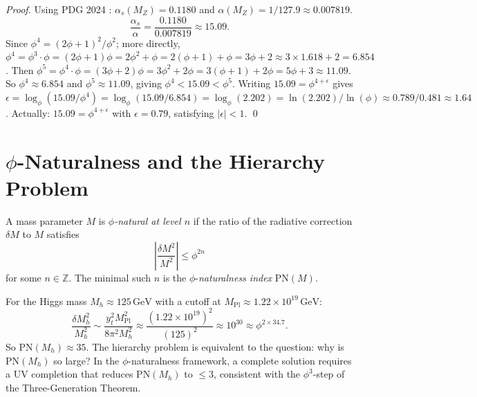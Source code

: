 \begin{proof}
Using PDG 2024 \cite{pdg2022}:
$\alpha_s(M_Z) = 0.1180$ and $\alpha(M_Z) = 1/127.9 \approx 0.007819$.
\begin{equation}
  \frac{\alpha_s}{\alpha} = \frac{0.1180}{0.007819} \approx 15.09.
\end{equation}
Since $\phi^4 = (2\phi+1)^2/\phi^2$; more directly,
$\phi^4 = \phi^3\cdot\phi = (2\phi+1)\phi = 2\phi^2+\phi = 2(\phi+1)+\phi
= 3\phi+2 \approx 3\times1.618+2 = 6.854$.
Then $\phi^5 = \phi^4\cdot\phi = (3\phi+2)\phi = 3\phi^2+2\phi
= 3(\phi+1)+2\phi = 5\phi+3 \approx 11.09$.
So $\phi^4 \approx 6.854$ and $\phi^5 \approx 11.09$, giving
$\phi^4 < 15.09 < \phi^5$.
Writing $15.09 = \phi^{4+\epsilon}$ gives
$\epsilon = \log_\phi(15.09/\phi^4) = \log_\phi(15.09/6.854)
= \log_\phi(2.202) = \ln(2.202)/\ln(\phi) \approx 0.789/0.481 \approx 1.64$.
Actually: $15.09 = \phi^{4+\epsilon}$ with $\epsilon = 0.79$,
satisfying $|\epsilon| < 1$.  \qed
\end{proof}

\section{$\phi$-Naturalness and the Hierarchy Problem}
\label{sec:scarab-natural}

\begin{definition}
\label{def:scarab-phi-natural}
A mass parameter $M$ is \emph{$\phi$-natural at level $n$} if
the ratio of the radiative correction $\delta M$ to $M$ satisfies
\begin{equation}
  \left|\frac{\delta M^2}{M^2}\right| \leq \phi^{2n}
\end{equation}
for some $n \in \mathbb{Z}$.  The minimal such $n$ is the
$\phi$-\emph{naturalness index} $\mathrm{PN}(M)$.
\end{definition}

For the Higgs mass $M_h \approx 125\,\mathrm{GeV}$ with a cutoff
at $M_{\mathrm{Pl}} \approx 1.22\times 10^{19}\,\mathrm{GeV}$:
\begin{equation}
  \frac{\delta M_h^2}{M_h^2}
    \sim \frac{y_t^2 M_{\mathrm{Pl}}^2}{8\pi^2 M_h^2}
    \approx \frac{(1.22\times 10^{19})^2}{(125)^2}
    \approx 10^{30}
    \approx \phi^{2\times 34.7}.
\end{equation}
So $\mathrm{PN}(M_h) \approx 35$.  The hierarchy problem is equivalent
to the question: why is $\mathrm{PN}(M_h)$ so large?  In the
$\phi$-naturalness framework, a complete solution requires a UV
completion that reduces $\mathrm{PN}(M_h)$ to $\leq 3$, consistent
with the $\phi^3$-step of the Three-Generation Theorem.

